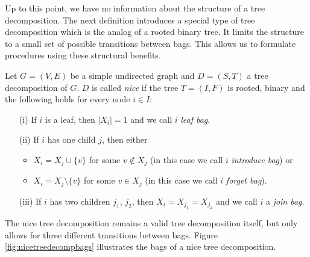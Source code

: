 Up to this point, we have no information about the structure of a tree decomposition. The next definition introduces a special type of tree decomposition which is the analog of a rooted binary tree. It limits the structure to a small set of possible transitions between bags. This allows us to formulate procedures using these structural benefits.

\begin{definition}
	\label{def:nicetreedecomp}
	Let $G = (V, E)$ be a simple undirected graph and $D = (S, T)$ a tree decomposition of $G$. $D$ is called \textit{nice} if the tree $T = (I, F)$ is rooted, binary and the following holds for every node $i \in I$:
	\begin{itemize}
		\item[(i)] If $i$ is a leaf, then $|X_i|=1$ and we call $i$ \textit{leaf bag}.
		\item[(ii)] If $i$ has one child $j$, then either
		\begin{itemize}
        	\item $X_i = X_j \cup \{v\}$ for some $v \notin X_j$ (in this case we call $i$ \textit{introduce bag}) or
        	\item $X_i = X_j \setminus \{v\}$ for some $v \in X_j$ (in this case we call $i$ \textit{forget bag}).
    	\end{itemize}
		\item[(iii)] If $i$ has two children $j_1$, $j_2$, then $X_i = X_{j_1} = X_{j_2}$ and we call $i$ a \textit{join bag}.
	\end{itemize}
\end{definition}

The nice tree decomposition remains a valid tree decomposition itself, but only allows for three different transitions between bags. Figure \ref{fig:nicetreedecompbags} illustrates the bags of a nice tree decomposition.

